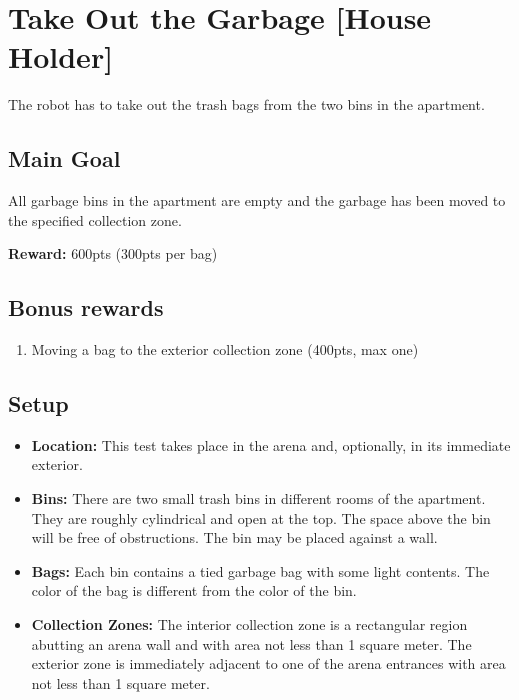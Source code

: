 \section{Take Out the Garbage [House Holder]}
The robot has to take out the trash bags from the two bins in the apartment.


\subsection{Main Goal}
All garbage bins in the apartment are empty and the garbage has been moved to the specified collection zone.

\noindent\textbf{Reward:} 600pts (300pts per bag)

\subsection{Bonus rewards}
\begin{enumerate}[nosep]
	\item Moving a bag to the exterior collection zone (400pts, max one)
\end{enumerate}

\subsection{Setup}
\begin{itemize}[nosep]
	\item \textbf{Location:} This test takes place in the arena and, optionally, in its immediate exterior.
	\item \textbf{Bins:} There are two small trash bins in different rooms of the apartment. They are roughly cylindrical and open at the top. The space above the bin will be free of obstructions. The bin may be placed against a wall.
	\item \textbf{Bags:} Each bin contains a tied garbage bag with some light contents. The color of the bag is different from the color of the bin.
	\item \textbf{Collection Zones:} The interior collection zone is a rectangular region abutting an arena wall and with area not less than 1 square meter. The exterior zone is immediately adjacent to one of the arena entrances with area not less than 1 square meter. 
\end{itemize}


